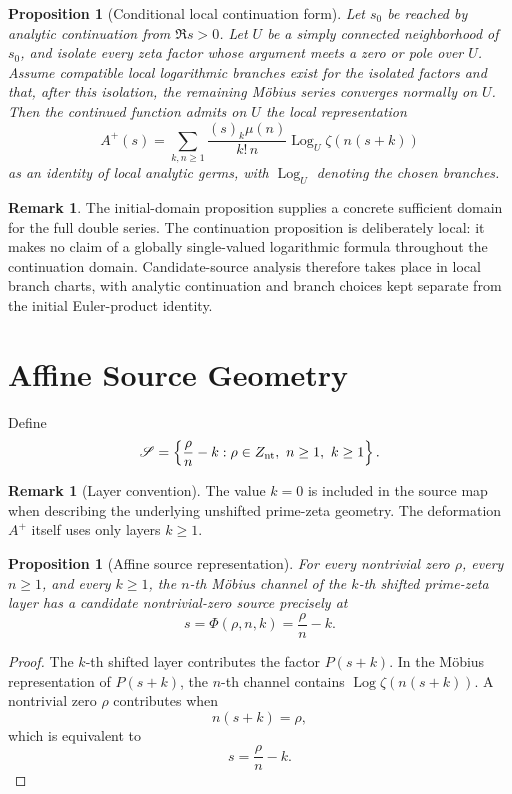 \documentclass[11pt]{article}
\newtheorem{proposition}[theorem]{Proposition}
\theoremstyle{definition}
\newtheorem{remark}[theorem]{Remark}
\newcommand{\Znt}{Z_{\rm nt}}
\newcommand{\PhiA}{\Phi}
\newcommand{\Logz}{\operatorname{Log}}
\begin{document}
\begin{proposition}[Conditional local continuation form]
\label{prop:local-continuation}
Let $s_0$ be reached by analytic continuation from $\Re s>0$. Let $U$ be a simply connected neighborhood of $s_0$, and isolate every zeta factor whose argument meets a zero or pole over $U$. Assume compatible local logarithmic branches exist for the isolated factors and that, after this isolation, the remaining Möbius series converges normally on $U$. Then the continued function admits on $U$ the local representation
\[
A^+(s)=
\sum_{k,n\ge1}
\frac{(s)_k\mu(n)}{k!\,n}
\Logz_U\zeta(n(s+k))
\]
as an identity of local analytic germs, with $\Logz_U$ denoting the chosen branches.
\end{proposition}

\begin{remark}
The initial-domain proposition supplies a concrete sufficient domain for the full double series. The continuation proposition is deliberately local: it makes no claim of a globally single-valued logarithmic formula throughout the continuation domain. Candidate-source analysis therefore takes place in local branch charts, with analytic continuation and branch choices kept separate from the initial Euler-product identity.
\end{remark}

\section{Affine Source Geometry}

Define
\[
\mathscr S=
\left\{
\frac{\rho}{n}-k:
\rho\in\Znt,\ n\ge1,\ k\ge1
\right\}.
\]

\begin{remark}[Layer convention]
The value $k=0$ is included in the source map when describing the underlying unshifted prime-zeta geometry. The deformation $A^+$ itself uses only layers $k\ge1$.
\end{remark}

\begin{proposition}[Affine source representation]
\label{prop:affine-source}
For every nontrivial zero $\rho$, every $n\ge1$, and every $k\ge1$, the $n$-th Möbius channel of the $k$-th shifted prime-zeta layer has a candidate nontrivial-zero source precisely at
\[
\boxed{
 s=\PhiA(\rho,n,k)=\frac{\rho}{n}-k.
}
\]
\end{proposition}

\begin{proof}
The $k$-th shifted layer contributes the factor $P(s+k)$. In the Möbius representation of $P(s+k)$, the $n$-th channel contains $\Logz\zeta(n(s+k))$. A nontrivial zero $\rho$ contributes when
\[
n(s+k)=\rho,
\]
which is equivalent to
\[
s=\frac{\rho}{n}-k.
\]
\end{proof}
\end{document}
